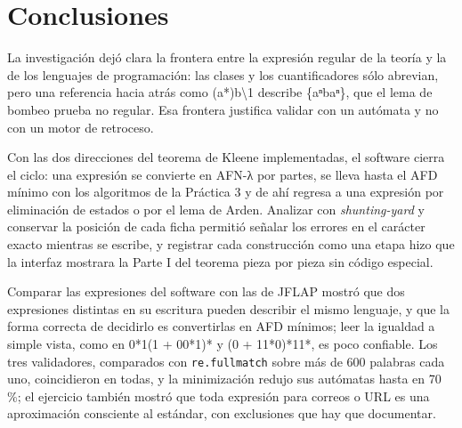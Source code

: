 \hypertarget{conclusiones}{%
\section{Conclusiones}\label{conclusiones}}

La investigación dejó clara la frontera entre la expresión regular de la teoría y la de los lenguajes de programación: las clases y los cuantificadores sólo abrevian, pero una referencia hacia atrás como (a*)b\textbackslash1 describe \{aⁿbaⁿ\}, que el lema de bombeo prueba no regular. Esa frontera justifica validar con un autómata y no con un motor de retroceso.

Con las dos direcciones del teorema de Kleene implementadas, el software cierra el ciclo: una expresión se convierte en AFN-λ por partes, se lleva hasta el AFD mínimo con los algoritmos de la Práctica 3 y de ahí regresa a una expresión por eliminación de estados o por el lema de Arden. Analizar con \emph{shunting-yard} y conservar la posición de cada ficha permitió señalar los errores en el carácter exacto mientras se escribe, y registrar cada construcción como una etapa hizo que la interfaz mostrara la Parte I del teorema pieza por pieza sin código especial.

Comparar las expresiones del software con las de JFLAP mostró que dos expresiones distintas en su escritura pueden describir el mismo lenguaje, y que la forma correcta de decidirlo es convertirlas en AFD mínimos; leer la igualdad a simple vista, como en 0*1(1 + 00*1)* y (0 + 11*0)*11*, es poco confiable. Los tres validadores, comparados con \texttt{re.fullmatch} sobre más de 600 palabras cada uno, coincidieron en todas, y la minimización redujo sus autómatas hasta en 70 \%; el ejercicio también mostró que toda expresión para correos o URL es una aproximación consciente al estándar, con exclusiones que hay que documentar.

